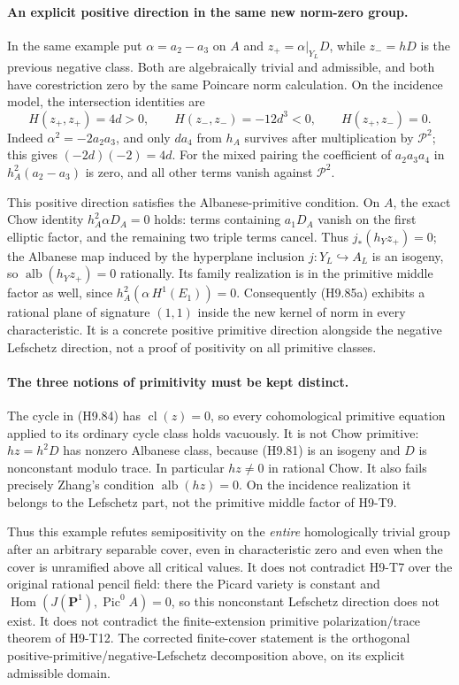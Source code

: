\paragraph{An explicit positive direction in the same new norm-zero group.}
In the same example put $\alpha=a_2-a_3$ on $A$ and
$z_+=\alpha|_{Y_L}D$, while $z_-=hD$ is the previous negative
class. Both are algebraically trivial and admissible, and both
have corestriction zero by the same Poincare norm calculation.
On the incidence model, the intersection identities are
\[
 H(z_+,z_+)=4d>0,\qquad H(z_-,z_-)=-12d^3<0,
                   \qquad H(z_+,z_-)=0.                    \tag{H9.85a}
\]
Indeed $\alpha^2=-2a_2a_3$, and only $d a_4$ from $h_A$
survives after multiplication by $\mathcal P^2$; this gives
$(-2d)(-2)=4d$. For the mixed pairing the coefficient of
$a_2a_3a_4$ in $h_A^2(a_2-a_3)$ is zero, and all other terms
vanish against $\mathcal P^2$.

This positive direction satisfies the Albanese-primitive condition.
On $A$, the exact Chow identity
$h_A^2\alpha D_A=0$ holds: terms containing $a_1D_A$ vanish on
the first elliptic factor, and the remaining two triple terms
cancel. Thus $j_*(h_Yz_+)=0$; the Albanese map induced by the
hyperplane inclusion $j:Y_L\hookrightarrow A_L$ is an isogeny,
so $\operatorname{alb}(h_Yz_+)=0$ rationally. Its family
realization is in the primitive middle factor as well, since
$h_A^2(\alpha\,H^1(E_1))=0$.
Consequently (H9.85a) exhibits a rational plane of signature
$(1,1)$ inside the new kernel of norm in every characteristic.
It is a concrete positive primitive direction alongside the
negative Lefschetz direction, not a proof of positivity on all
primitive classes.

\paragraph{The three notions of primitivity must be kept distinct.}
The cycle in (H9.84) has $\operatorname{cl}(z)=0$, so every
cohomological primitive equation applied to its ordinary cycle
class holds vacuously. It is not Chow primitive: $hz=h^2D$ has
nonzero Albanese class, because (H9.81) is an isogeny and $D$ is
nonconstant modulo trace. In particular $hz\ne0$ in rational Chow.
It also fails precisely Zhang's condition
$\operatorname{alb}(hz)=0$. On the incidence realization it belongs
to the Lefschetz part, not the primitive middle factor of H9-T9.

Thus this example refutes semipositivity on the \emph{entire}
homologically trivial group after an arbitrary separable cover,
even in characteristic zero and even when the cover is unramified
above all critical values. It does not contradict H9-T7 over the
original rational pencil field: there the Picard variety is
constant and $\operatorname{Hom}(J(\mathbf P^1),\operatorname{Pic}^0A)=0$,
so this nonconstant Lefschetz direction does not exist. It does not
contradict the finite-extension primitive polarization/trace theorem
of H9-T12. The corrected finite-cover statement is the orthogonal
positive-primitive/negative-Lefschetz decomposition above, on its
explicit admissible domain.

